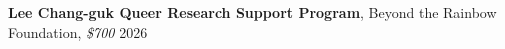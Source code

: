 \textbf{Lee Chang-guk Queer Research Support Program}, Beyond the Rainbow Foundation, \textit{\$700} \hfill{2026} \\
